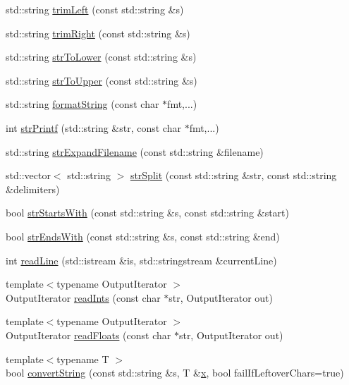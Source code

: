 \begin{DoxyCompactItemize}
\item 
std\+::string \hyperlink{group__utils_ga1e3dc946d073cacb02cf458d67471ad5}{trim\+Left} (const std\+::string \&s)
\item 
std\+::string \hyperlink{group__utils_ga3e3eb912f0f9e272e81127f1653edf38}{trim\+Right} (const std\+::string \&s)
\item 
std\+::string \hyperlink{group__utils_ga98a43706466c9618576a0f23e9021457}{str\+To\+Lower} (const std\+::string \&s)
\item 
std\+::string \hyperlink{group__utils_gac5545be3a953651c68fe8c81313f2564}{str\+To\+Upper} (const std\+::string \&s)
\item 
std\+::string \hyperlink{group__utils_ga948eee11520b4508727e2020b36faa48}{format\+String} (const char $\ast$fmt,...)
\item 
int \hyperlink{group__utils_gad6042db9246017195692a73ec62abc5f}{str\+Printf} (std\+::string \&str, const char $\ast$fmt,...)
\item 
std\+::string \hyperlink{group__utils_ga198d4ceebba5de14cd7e40be2a06c277}{str\+Expand\+Filename} (const std\+::string \&filename)
\item 
std\+::vector$<$ std\+::string $>$ \hyperlink{group__utils_ga8e1ffa60787d006502c7c94f5646c598}{str\+Split} (const std\+::string \&str, const std\+::string \&delimiters)
\item 
bool \hyperlink{group__utils_gac8a541b33cded5c67d9cab7ada51c13d}{str\+Starts\+With} (const std\+::string \&s, const std\+::string \&start)
\item 
bool \hyperlink{group__utils_ga46ed3632c02c1e103629e7114c715880}{str\+Ends\+With} (const std\+::string \&s, const std\+::string \&end)
\item 
int \hyperlink{group__utils_ga07aa1d8e5a4e25d0170010df66908611}{read\+Line} (std\+::istream \&is, std\+::stringstream \&current\+Line)
\item 
{\footnotesize template$<$typename Output\+Iterator $>$ }\\Output\+Iterator \hyperlink{group__utils_gae501003a8f6b60afb846857fdb82174d}{read\+Ints} (const char $\ast$str, Output\+Iterator out)
\item 
{\footnotesize template$<$typename Output\+Iterator $>$ }\\Output\+Iterator \hyperlink{group__utils_ga88353c6cfc2e519df07814ca577e71ec}{read\+Floats} (const char $\ast$str, Output\+Iterator out)
\item 
{\footnotesize template$<$typename T $>$ }\\bool \hyperlink{group__utils_ga599c46f6984e9a2147fac39324e9fadc}{convert\+String} (const std\+::string \&s, T \&\hyperlink{sparse__helper_8cpp_af88b946fb90d5f08b5fb740c70e98c10}{x}, bool fail\+If\+Leftover\+Chars=true)

\end{DoxyCompactItemize}
